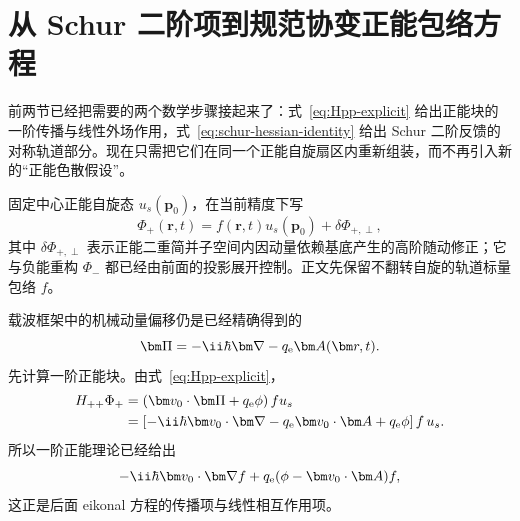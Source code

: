 \section{从 Schur 二阶项到规范协变正能包络方程}

前两节已经把需要的两个数学步骤接起来了：式~\eqref{eq:Hpp-explicit} 给出正能块的一阶传播与线性外场作用，式~\eqref{eq:schur-hessian-identity} 给出 Schur 二阶反馈的对称轨道部分。现在只需把它们在同一个正能自旋扇区内重新组装，而不再引入新的“正能色散假设”。

固定中心正能自旋态 $u_s(\bm p_0)$，在当前精度下写
\begin{equation}
\Phi_+(\bm r,t)=f(\bm r,t)u_s(\bm p_0)+\delta\Phi_{+,\perp},
\label{eq:positive-envelope-decomposition}
\end{equation}
其中 $\delta\Phi_{+,\perp}$ 表示正能二重简并子空间内因动量依赖基底产生的高阶随动修正；它与负能重构 $\Phi_-$ 都已经由前面的投影展开控制。正文先保留不翻转自旋的轨道标量包络 $f$。

载波框架中的机械动量偏移仍是已经精确得到的
\begin{equation}
\bm\Pi=-\ii\hbar\bm\nabla-q_{\rm e}\bm A(\bm r,t).
\label{eq:relative-kinetic-momentum}
\end{equation}
先计算一阶正能块。由式~\eqref{eq:Hpp-explicit}，
\begin{align}
H_{++}\Phi_+
&=\left(\bm v_0\cdot\bm\Pi+q_{\rm e}\phi\right)
 f u_s\\
&=\left[-\ii\hbar\bm v_0\cdot\bm\nabla
-q_{\rm e}\bm v_0\cdot\bm A+q_{\rm e}\phi\right]f\,u_s.
\label{eq:Hpp-on-envelope}
\end{align}
所以一阶正能理论已经给出
\begin{equation}
-\ii\hbar\bm v_0\cdot\bm\nabla f
+q_{\rm e}(\phi-\bm v_0\cdot\bm A)f,
\end{equation}
这正是后面 eikonal 方程的传播项与线性相互作用项。


